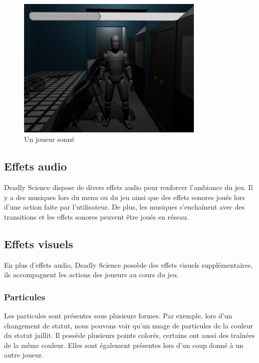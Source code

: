 \documentclass{article}
\begin{document}
\begin{figure}[H]
\centering
\includegraphics[width=0.8\textwidth]{cc/stamina_stunned.png}
\caption{Un joueur sonné}
\label{cc_b}
\end{figure}


\subsection{Effets audio}


Deadly Science dispose de divers effets audio pour renforcer l'ambiance du jeu.
Il y a des musiques lors du menu ou du jeu ainsi que des effets sonores joués lors d'une action faite par l'utilisateur. 
De plus, les musiques s'enchaînent avec des transitions et les effets sonores peuvent être joués en réseau.


\subsection{Effets visuels}


En plus d'effets audio, Deadly Science possède des effets visuels supplémentaires, ils accompagnent les actions des joueurs au cours du jeu.


\subsubsection{Particules}


Les particules sont présentes sous plusieurs formes.
Par exemple, lors d'un changement de statut, nous pouvons voir qu'un nuage de particules de la couleur du statut jaillit. Il possède plusieurs points colorés, certains ont aussi des traînées de la même couleur.
Elles sont également présentes lors d'un coup donné à un autre joueur.
\end{document}
